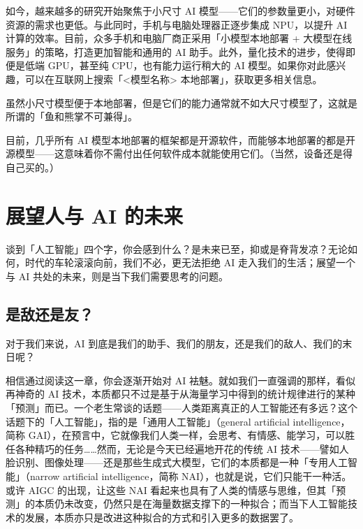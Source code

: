 如今，越来越多的研究开始聚焦于小尺寸 AI 模型——它们的参数量更小，对硬件资源的需求也更低。与此同时，手机与电脑处理器正逐步集成 NPU，以提升 AI 计算的效率。目前，众多手机和电脑厂商正采用「小模型本地部署 + 大模型在线服务」的策略，打造更加智能和通用的 AI 助手。此外，量化技术的进步，使得即便是低端 GPU，甚至纯 CPU，也有能力运行稍大的 AI 模型。如果你对此感兴趣，可以在互联网上搜索\clearglue{}「<模型名称> 本地部署」\restoreglue{}，获取更多相关信息。

\begin{note}
  虽然小尺寸模型便于本地部署，但是它们的能力通常就不如大尺寸模型了，这就是所谓的「鱼和熊掌不可兼得」。
\end{note}

\begin{dangerbox}
  目前，几乎所有 AI 模型本地部署的框架都是开源软件，而能够本地部署的都是开源模型——这意味着你不需付出任何软件成本就能使用它们。（当然，设备还是得自己买的。）
\end{dangerbox}

\section{展望人与 AI 的未来}

谈到「人工智能」四个字，你会感到什么？是未来已至，抑或是脊背发凉？无论如何，时代的车轮滚滚向前，我们不必，更无法拒绝 AI 走入我们的生活；展望一个与 AI 共处的未来，则是当下我们需要思考的问题。

\subsection{是敌还是友？}

对于我们来说，AI 到底是我们的助手、我们的朋友，还是我们的敌人、我们的末日呢？

相信通过阅读这一章，你会逐渐开始对 AI 袪魅。就如我们一直强调的那样，看似再神奇的 AI 技术，本质都只不过是基于从海量学习中得到的统计规律进行的某种「预测」而已。一个老生常谈的话题——人类距离真正的人工智能还有多远？这个话题下的「人工智能」，指的是「通用人工智能」（general artificial intelligence，简称 GAI），在预言中，它就像我们人类一样，会思考、有情感、能学习，可以胜任各种精巧的任务……然而，无论是今天已经遍地开花的传统 AI 技术——譬如人脸识别、图像处理——还是那些生成式大模型，它们的本质都是一种「专用人工智能」（narrow artificial intelligence，简称 NAI），也就是说，它们只能干一种活。或许 AIGC 的出现，让这些 NAI 看起来也具有了人类的情感与思维，但其「预测」的本质仍未改变，仍然只是在海量数据支撑下的一种拟合；而当下人工智能技术的发展，本质亦只是改进这种拟合的方式和引入更多的数据罢了。

